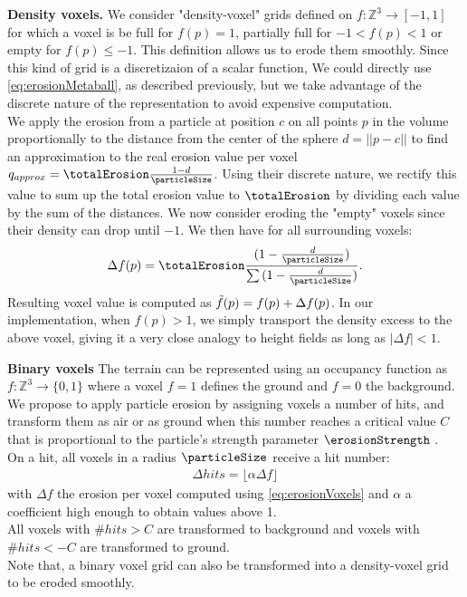 \textbf{Density voxels.}
\label{sec:application_on_density_voxels}
We consider "density-voxel" grids defined on $f: \mathbb{Z}^3 \rightarrow [-1, 1]$ for which a voxel is be full for $f(p) = 1$, partially full for $-1 < f(p) < 1$ or empty for $f(p) \leq -1$. 
This definition allows us to erode them smoothly. 
Since this kind of grid is a discretizaion of a scalar function, We could directly use \eqref{eq:erosionMetaball}, as described previously, but we take advantage of the discrete nature of the representation to avoid expensive computation. \\
We apply the erosion from a particle at position $c$ on all points $p$ in the volume proportionally to the distance from the center of the sphere $d = ||p - c||$ to find an approximation to the real erosion value per voxel $q_{approx} = \totalErosion \frac{1 - d}{\particleSize}$.
Using their discrete nature, we rectify this value to sum up the total erosion value to $\totalErosion$ by dividing each value by the sum of the distances. We now consider eroding the "empty" voxels since their density can drop until $-1$. We then have for all surrounding voxels: 
\begin{align} \label{eq:erosionVoxels}
\Delta f(p) = \totalErosion \frac{ (1 - \frac{d}{\particleSize} )}{ \sum {(1 - \frac{d}{\particleSize})}}.
\end{align}
Resulting voxel value is computed as $\Tilde{f}(p) = f(p) + \Delta f(p)$.
In our implementation, when $f(p) > 1$, we simply transport the density excess to the above voxel, giving it a very close analogy to height fields as long as $|\Delta f| < 1$. 

\textbf{Binary voxels}
\label{sec:application_on_binary_voxels}
The terrain can be represented using an occupancy function as $f: \mathbb{Z}^3 \rightarrow \{0, 1\}$ where a voxel $f = 1$ defines the ground and $f = 0$ the background. \\ 
We propose to apply particle erosion by assigning voxels a number of hits, and transform them as air or as ground when this number reaches a critical value $C$ that is proportional to the particle's strength parameter $\erosionStrength$ \cite{Jones2010}. \\ 
On a hit, all voxels in a radius $\particleSize$ receive a hit number: 
\begin{align} \label{eq:erosionDiscreteVoxels}
\Delta hits = \lfloor \alpha \Delta f \rfloor
\end{align}
with $\Delta f$ the erosion per voxel computed using \eqref{eq:erosionVoxels} and $\alpha$ a coefficient high enough to obtain values above 1. \\ 
All voxels with $\# hits > C$ are transformed to background and voxels with $\# hits < -C$ are transformed to ground.\\
Note that, a binary voxel grid can also be transformed into a density-voxel grid to be eroded smoothly.

